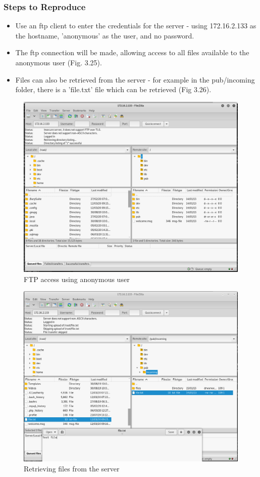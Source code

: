 \documentclass{report}
\begin{document}
\subsubsection{Steps to Reproduce}
\begin{itemize}
	\item Use an ftp client to enter the credentials for the server - using 172.16.2.133 as the hostname, 'anonymous' as the user, and no password.
	\item The ftp connection will be made, allowing access to all files available to the anonymous user (Fig. 3.25).
	\item Files can also be retrieved from the server - for example in the pub/incoming folder, there is a 'file.txt' file which can be retrieved (Fig 3.26).
\end{itemize}

\begin{figure}[!htb]
	\centering
	\includegraphics[scale=0.6]{img/ftp1.png}
	\caption{FTP access using anonymous user}
\end{figure}
\begin{figure}[!htb]
	\centering
	\includegraphics[scale=0.6]{img/ftp2.png}
	\caption{Retrieving files from the server}
\end{figure}
\end{document}
